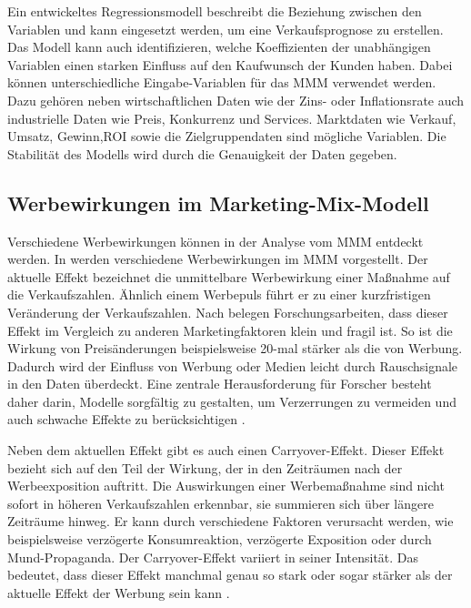 Ein entwickeltes Regressionsmodell beschreibt die Beziehung zwischen den Variablen und kann eingesetzt werden, um eine Verkaufsprognose zu erstellen. Das Modell kann auch identifizieren, welche Koeffizienten der unabhängigen Variablen einen starken Einfluss auf den Kaufwunsch der Kunden haben. Dabei können unterschiedliche Eingabe-Variablen für das \ac{MMM} verwendet werden. Dazu gehören neben wirtschaftlichen Daten wie der Zins- oder Inflationsrate auch industrielle
Daten wie Preis, Konkurrenz und Services. Marktdaten wie Verkauf, Umsatz, Gewinn,\ac{ROI} sowie die Zielgruppendaten sind mögliche Variablen. Die Stabilität des Modells wird durch die Genauigkeit der Daten gegeben. 
\subsection{Werbewirkungen im Marketing-Mix-Modell}
\label{WerbeeffekteImMMM}
Verschiedene Werbewirkungen können in der Analyse vom \ac{MMM} entdeckt werden. In \cite{Pandey2021MMM} werden verschiedene Werbewirkungen im \ac{MMM} vorgestellt. Der aktuelle Effekt bezeichnet die unmittelbare Werbewirkung einer Maßnahme auf die Verkaufszahlen. Ähnlich einem Werbepuls führt er zu einer kurzfristigen Veränderung der Verkaufszahlen. Nach \cite{Pandey2021MMM} belegen Forschungsarbeiten, dass dieser Effekt im Vergleich zu anderen Marketingfaktoren klein und fragil ist. So ist die Wirkung von Preisänderungen beispielsweise 20-mal stärker als die von Werbung. Dadurch wird der Einfluss von Werbung oder Medien leicht durch Rauschsignale in den Daten überdeckt. Eine zentrale Herausforderung für Forscher besteht daher darin, Modelle sorgfältig zu gestalten, um Verzerrungen zu vermeiden und auch schwache Effekte zu berücksichtigen \cite[785]{Pandey2021MMM}. \par
Neben dem aktuellen Effekt gibt es auch einen Carryover-Effekt. Dieser Effekt bezieht sich auf den Teil der Wirkung, der in den Zeiträumen nach der Werbeexposition auftritt. Die Auswirkungen einer Werbemaßnahme sind nicht sofort in höheren Verkaufszahlen erkennbar, sie summieren sich über längere Zeiträume hinweg. Er kann durch verschiedene Faktoren verursacht werden, wie beispielsweise verzögerte Konsumreaktion, verzögerte Exposition oder durch Mund-Propaganda. Der Carryover-Effekt variiert in seiner Intensität. Das bedeutet, dass dieser Effekt manchmal genau so stark oder sogar stärker als der aktuelle Effekt der Werbung sein kann \cite[785]{Pandey2021MMM}.
